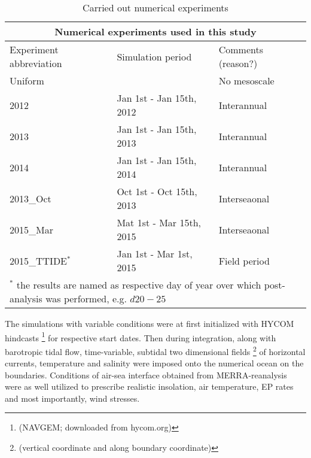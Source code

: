 \documentclass[12pt]{article}
\begin{document}
\begin{table}
	\caption{Carried out numerical experiments}
	\begin{tabular}{ |p{3cm}||p{5cm}|p{5cm}|  }
		\hline
		\multicolumn{3}{|c|}{Numerical experiments used in this study} \\
		\hline
		Experiment abbreviation & Simulation period & Comments (reason?) \\
		\hline
		Uniform & ~ & No mesoscale \\
		2012 &   Jan 1st - Jan 15th, 2012 & Interannual \\
		2013 &   Jan 1st - Jan 15th, 2013 & Interannual \\
		2014 &   Jan 1st - Jan 15th, 2014 & Interannual \\
		2013\_Oct &   Oct 1st - Oct 15th, 2013 & Interseaonal \\
		2015\_Mar &   Mat 1st - Mar 15th, 2015 & Interseaonal \\
		2015\_TTIDE$^{\ast}$ &   Jan 1st - Mar 1st, 2015 & Field period \\
		\hline
		\multicolumn{3}{|l|}{\footnotesize$^{\ast}$ the results are named as respective day of 
		year over which post-analysis was performed, e.g. $d20-25$ }\\
		\hline
	\end{tabular}
	\label{ch2:table_exp}
\end{table}
The simulations with variable conditions were at first initialized with HYCOM hindcasts 
\footnote{(NAVGEM;	downloaded from hycom.org)} for respective start dates. Then during 
integration, 
along with barotropic tidal flow, time-variable, subtidal two dimensional fields 
\footnote{(vertical coordinate and along boundary coordinate)} of horizontal currents, temperature 
and salinity were imposed onto the numerical ocean on the boundaries. Conditions of air-sea 
interface obtained from MERRA-reanalysis \citep{rienecker2011merra} were as well utilized to 
prescribe realistic insolation, air temperature, EP rates and most importantly, wind stresses.
\end{document}
